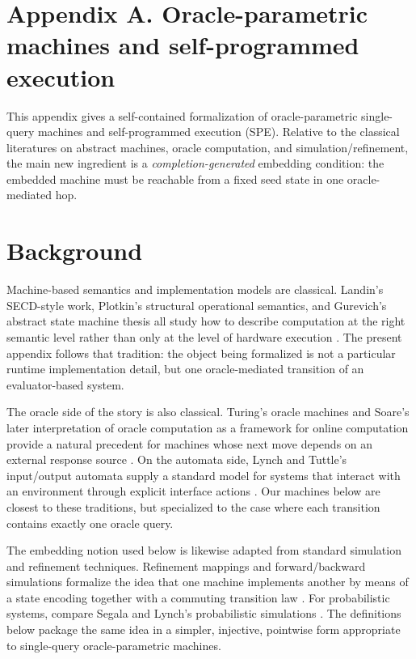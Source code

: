 \documentclass[11pt]{article}
\begin{document}
\section*{Appendix A. Oracle-parametric machines and self-programmed execution}

This appendix gives a self-contained formalization of oracle-parametric single-query machines and self-programmed execution (SPE). Relative to the classical literatures on abstract machines, oracle computation, and simulation/refinement, the main new ingredient is a \emph{completion-generated} embedding condition: the embedded machine must be reachable from a fixed seed state in one oracle-mediated hop.

\setcounter{section}{0}
\renewcommand{\thesection}{A.\arabic{section}}

\section{Background}

Machine-based semantics and implementation models are classical. Landin's SECD-style work, Plotkin's structural operational semantics, and Gurevich's abstract state machine thesis all study how to describe computation at the right semantic level rather than only at the level of hardware execution \cite{Landin64,Plotkin81,Gurevich00}. The present appendix follows that tradition: the object being formalized is not a particular runtime implementation detail, but one oracle-mediated transition of an evaluator-based system.

The oracle side of the story is also classical. Turing's oracle machines and Soare's later interpretation of oracle computation as a framework for online computation provide a natural precedent for machines whose next move depends on an external response source \cite{Turing39,Soare09}. On the automata side, Lynch and Tuttle's input/output automata supply a standard model for systems that interact with an environment through explicit interface actions \cite{LynchTuttle89}. Our machines below are closest to these traditions, but specialized to the case where each transition contains exactly one oracle query.

The embedding notion used below is likewise adapted from standard simulation and refinement techniques. Refinement mappings and forward/backward simulations formalize the idea that one machine implements another by means of a state encoding together with a commuting transition law \cite{AbadiLamport91,LynchVaandrager95}. For probabilistic systems, compare Segala and Lynch's probabilistic simulations \cite{SegalaLynch95}. The definitions below package the same idea in a simpler, injective, pointwise form appropriate to single-query oracle-parametric machines.
\end{document}

